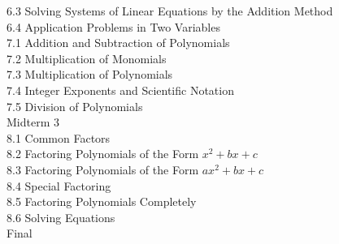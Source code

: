 \documentclass{ximera}
\begin{document}
6.3 Solving Systems of Linear Equations by the Addition Method\\
6.4 Application Problems in Two Variables\\
7.1 Addition and Subtraction of Polynomials\\
7.2 Multiplication of Monomials\\
7.3 Multiplication of Polynomials\\
7.4 Integer Exponents and Scientific Notation\\
7.5 Division of Polynomials\\
Midterm 3\\
8.1 Common Factors\\
8.2 Factoring Polynomials of the Form $x^{2}+b x+c$\\
8.3 Factoring Polynomials of the Form $a x^{2}+b x+c$\\
8.4 Special Factoring\\
8.5 Factoring Polynomials Completely\\
8.6 Solving Equations\\
Final
\end{document}
